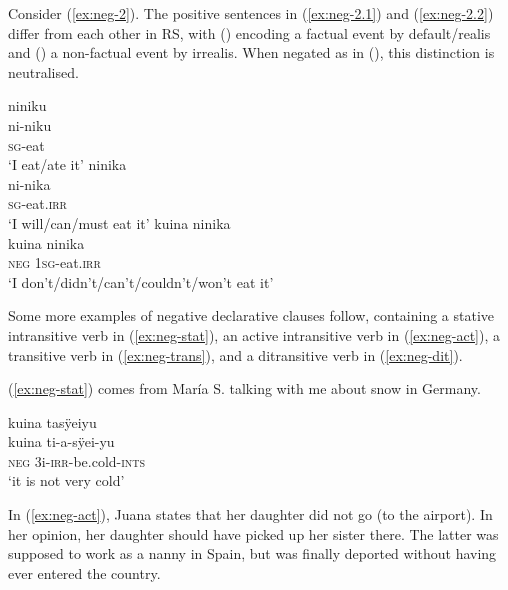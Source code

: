 Consider (\ref{ex:neg-2}). The positive sentences in (\ref{ex:neg-2.1}) and (\ref{ex:neg-2.2}) differ from each other in RS, with () encoding a factual event by default/realis and () a non-factual event by irrealis. When negated as in (), this distinction is neutralised.


\ea\label{ex:neg-2}
  \ea\label{ex:neg-2.1}
\begingl
\glpreamble niniku\\
\gla ni-niku\\
\textsc{sg}-eat\\
\glft ‘I eat/ate it’
\endgl
  \ex\label{ex:neg-2.2}
\begingl
\glpreamble ninika\\
\gla ni-nika\\
\textsc{sg}-eat.\textsc{irr}\\
\glft ‘I will/can/must eat it’
\endgl
  \ex\label{ex:neg-2.3}
\begingl
\glpreamble kuina ninika\\
\gla kuina ninika\\
\glb \textsc{neg} 1\textsc{sg}-eat.\textsc{irr}\\
\glft ‘I don’t/didn’t/can’t/couldn’t/won’t eat it’
\endgl
\z
\xe

Some more examples of negative declarative clauses follow, containing a stative intransitive verb  in (\ref{ex:neg-stat}), an active intransitive verb in (\ref{ex:neg-act}), a transitive verb in (\ref{ex:neg-trans}), and a ditransitive verb in (\ref{ex:neg-dit}).

(\ref{ex:neg-stat}) comes from María S. talking with me about snow in Germany.

\ea\label{ex:neg-stat}
\begingl
\glpreamble kuina tasÿeiyu\\
\gla kuina ti-a-sÿei-yu\\
\glb \textsc{neg} 3i-\textsc{irr}-be.cold-\textsc{ints}\\
\glft ‘it is not very cold’
\endgl
\trailingcitation{[rxx-e120511l.312]}
\xe

%

In (\ref{ex:neg-act}), Juana states that her daughter did not go (to the airport). In her opinion, her daughter should have picked up her sister there. The latter was supposed to work as a nanny in Spain, but was finally deported without having ever entered the country.

